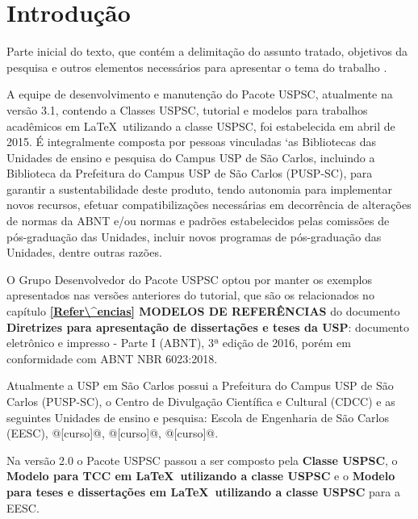 
\chapter[Introdução]{Introdução}
\label{Introdução}

Parte inicial do texto, que cont\'em a delimitação do assunto tratado, objetivos da pesquisa e outros elementos necess\'arios para apresentar o tema do trabalho \cite{aguia2020}.

A equipe de desenvolvimento e manutenção do Pacote USPSC, atualmente na versão 3.1, contendo a Classes USPSC, tutorial e modelos para trabalhos acad\^emicos em \LaTeX\ utilizando a classe USPSC, foi estabelecida em abril de 2015. É integralmente composta por pessoas vinculadas `as Bibliotecas das Unidades de ensino e pesquisa do Campus USP de São Carlos, incluindo a Biblioteca da Prefeitura do Campus USP de São Carlos (PUSP-SC), para garantir a sustentabilidade deste produto, tendo autonomia para implementar novos recursos, efetuar compatibilizações necess\'arias em decorr\^encia de alterações de normas da ABNT e/ou normas e padrões estabelecidos pelas comissões de pós-graduação das Unidades, incluir novos programas de pós-graduação das Unidades, dentre outras razões.

O Grupo Desenvolvedor do Pacote USPSC optou por manter os exemplos apresentados nas versões anteriores do tutorial, que são os relacionados no capítulo \textbf{\ref{Refer\^encias} MODELOS DE REFERÊNCIAS} do documento \textbf{Diretrizes para apresentação de dissertações e teses da USP}: documento eletrônico e impresso - Parte I (ABNT), 3ª edição de 2016, por\'em em conformidade com ABNT NBR 6023:2018. 

Atualmente a USP em São Carlos possui a Prefeitura do Campus USP de São Carlos (PUSP-SC), o Centro de Divulgação Científica e Cultural (CDCC) e as seguintes Unidades de ensino e pesquisa: Escola de Engenharia de São Carlos (EESC), @[curso]@, @[curso]@, @[curso]@.

Na versão 2.0 o Pacote USPSC passou a ser composto pela \textbf{Classe USPSC}, o \textbf{Modelo para TCC em \LaTeX\ utilizando a classe USPSC} e o \textbf{Modelo para teses e dissertações em \LaTeX\ utilizando a classe USPSC} para a EESC.

